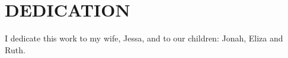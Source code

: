 \chapter*{DEDICATION}

I dedicate this work to my wife, Jessa, and to our children: Jonah, Eliza and Ruth.


